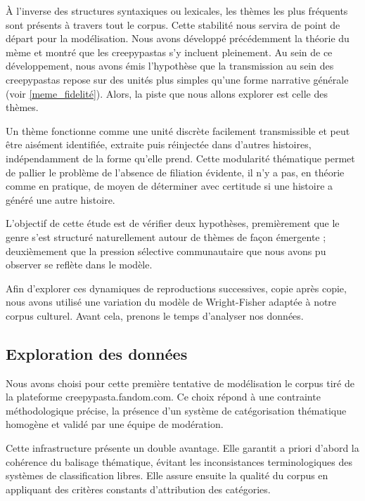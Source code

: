 \documentclass[12pt,a4paper,oneside,titlepage]{book} %
\begin{document}
À l'inverse des structures syntaxiques ou lexicales, les thèmes les plus fréquents sont présents à travers tout le corpus. Cette stabilité nous servira de point de départ pour la modélisation.
Nous avons développé précédemment la théorie du mème et montré que les creepypastas s'y incluent pleinement. Au sein de ce développement, nous avons émis l'hypothèse que la transmission au sein des creepypastas repose sur des unités plus simples qu'une forme narrative générale (voir \ref{meme_fidelité}). Alors, la piste que nous allons explorer est celle des thèmes.

Un thème fonctionne comme une unité discrète facilement transmissible et peut être aisément identifiée, extraite puis réinjectée dans d'autres histoires, indépendamment de la forme qu'elle prend. Cette modularité thématique permet de pallier le problème de l'absence de filiation évidente,  il n'y a pas, en théorie comme en pratique, de moyen de déterminer avec certitude si une histoire a généré une autre histoire.

L'objectif de cette étude est de vérifier deux hypothèses, premièrement que le genre s'est structuré naturellement autour de thèmes de façon émergente ; deuxièmement que la pression sélective communautaire que nous avons pu observer se reflète dans le modèle.

Afin d'explorer ces dynamiques de reproductions successives, copie après copie, nous avons utilisé une variation du modèle de Wright-Fisher adaptée à notre corpus culturel. Avant cela, prenons le temps d'analyser nos données.

\subsection{Exploration des données}

Nous avons choisi pour cette première tentative de modélisation le corpus tiré de la plateforme creepypasta.fandom.com. Ce choix répond à une contrainte méthodologique précise, la présence d'un système de catégorisation thématique homogène et validé par une équipe de modération.

Cette infrastructure présente un double avantage. Elle garantit a priori d'abord la cohérence du balisage thématique, évitant les inconsistances terminologiques des systèmes de classification libres. Elle assure ensuite la qualité du corpus en appliquant des critères constants d'attribution des catégories.
\end{document}
